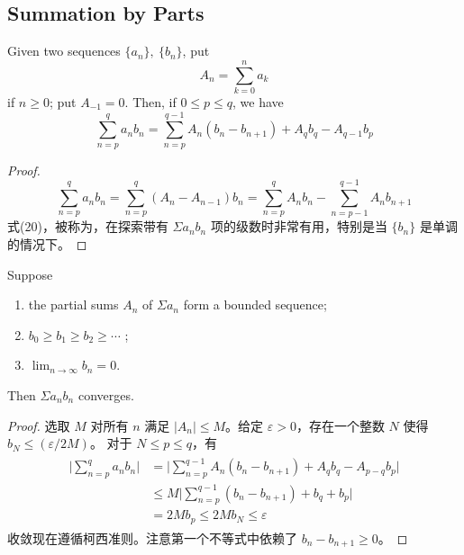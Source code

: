 \documentclass[../poma-notes.tex]{subfiles}
\begin{document}
\subsection*{Summation by Parts}

\begin{theorem}
  Given two sequences $\{a_n\},\ \{b_n\}$, put
  \[ A_n = \sum_{k=0}^{n} a_k \]
  if $n \ge 0$; put $A_{-1} = 0$. Then, if $0 \le p \le q$, we have
  \begin{equation}
    \sum_{n=p}^{q} a_n b_n = \sum_{n=p}^{q-1} A_n(b_n-b_{n+1}) + A_q b_q - A_{q-1}b_p
  \end{equation}
\end{theorem}

\begin{proof}
  \[
    \sum_{n=p}^{q} a_n b_n = \sum_{n=p}^{q}(A_n - A_{n-1})b_n = \sum_{n=p}^{q} A_n b_n - \sum_{n=p-1}^{q-1}A_n b_{n+1}
  \]
  式(20)，被称为，在探索带有 $\Sigma a_n b_n$ 项的级数时非常有用，特别是当 $\{b_n\}$
  是单调的情况下。
\end{proof}

\begin{theorem}
  Suppose
  \begin{enumerate}[label=(\alph*)]
    \item the partial sums $A_n$ of $\Sigma a_n$ form a bounded sequence;
    \item $b_0 \ge b_1 \ge b_2 \ge \cdots$ ;
    \item $\lim_{n\to\infty} b_n = 0$.
  \end{enumerate}
  Then $\Sigma a_n b_n$ converges.
\end{theorem}

\begin{proof}
  选取 $M$ 对所有 $n$ 满足 $|A_n| \le M$。给定 $\varepsilon > 0$，存在一个整数 $N$ 使得 $b_N \le (\varepsilon/2M)$。
  对于 $N \le p \le q$，有
  \begin{align*}
    \begin{split}
      \Biggl|\sum_{n=p}^{q} a_n b_n\Biggr| & = \Biggl|\sum_{n=p}^{q-1} A_n(b_n - b_{n+1}) + A_q b_q - A_{p-q} b_p\Biggr| \\
      & \le M \Biggl|\sum_{n=p}^{q-1}(b_n-b_{n+1}) + b_q + b_p\Biggr| \\
      & = 2M b_p \le 2M b_N \le \varepsilon
    \end{split}
  \end{align*}
  收敛现在遵循柯西准则。注意第一个不等式中依赖了 $b_n - b_{n+1} \ge 0$。
\end{proof}
\end{document}
